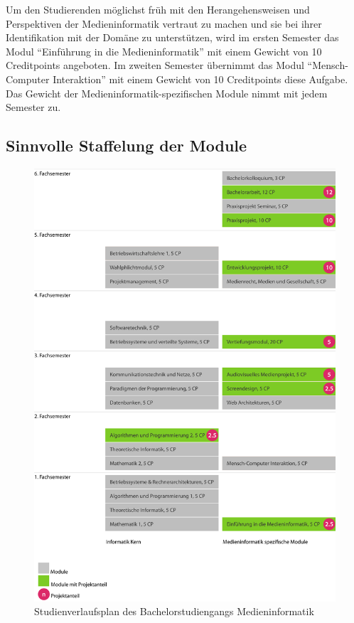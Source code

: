 Um den Studierenden möglichst früh mit den Herangehensweisen und
Perspektiven der Medieninformatik vertraut zu machen und sie bei ihrer
Identifikation mit der Domäne zu unterstützen, wird im ersten Semester
das Modul ``Einführung in die Medieninformatik'' mit einem Gewicht von
10 Creditpoints angeboten. Im zweiten Semester übernimmt das Modul
``Mensch-Computer Interaktion'' mit einem Gewicht von 10 Creditpoints
diese Aufgabe. Das Gewicht der Medieninformatik-spezifischen Module
nimmt mit jedem Semester zu.

\subsection{Sinnvolle Staffelung der
Module}\label{sinnvolle-staffelung-der-module}

\begin{figure}[htbp]
\centering
\includegraphics[width=\columnwidth]{../anhaenge/bilder/ba-verlaufsplan.png}
\caption{Studienverlaufsplan des Bachelorstudiengangs Medieninformatik}
\end{figure}


